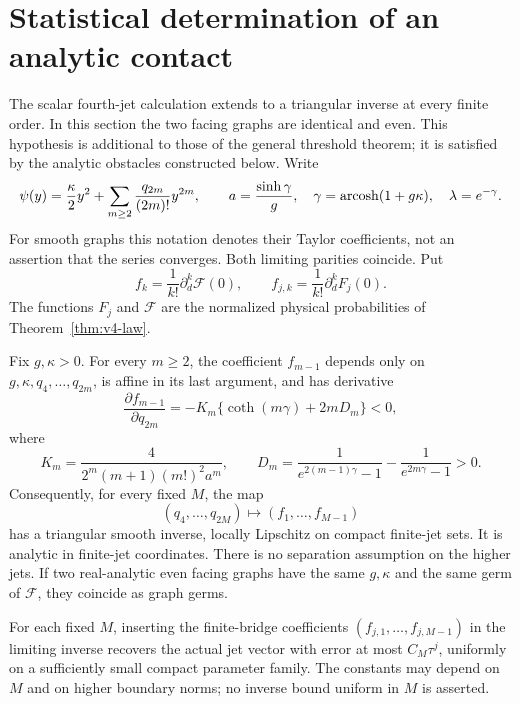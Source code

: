 \section{Statistical determination of an analytic contact}
\label{sec:v5-jets}
The scalar fourth-jet calculation extends to a triangular inverse at every
finite order. In this section the two facing graphs are identical and even.
This hypothesis is additional to those of the general threshold theorem;
it is satisfied by the analytic obstacles constructed below. Write
\begin{equation}\label{eq:v5-graph-series}
 \psi(y)=\frac\kappa2y^2+\sum_{m\ge2}\frac{q_{2m}}{(2m)!}y^{2m},
 \qquad a=\frac{\sinh\gamma}{g},\quad
 \gamma=\operatorname{arcosh}(1+g\kappa),\quad \lambda=e^{-\gamma}.
\end{equation}
For smooth graphs this notation denotes their Taylor coefficients, not an
assertion that the series converges. Both limiting parities coincide. Put
\[
 f_k=\frac1{k!}\partial_d^k\mathcal F(0),\qquad
 f_{j,k}=\frac1{k!}\partial_d^kF_j(0).
\]
The functions $F_j$ and $\mathcal F$ are the normalized physical
probabilities of Theorem~\ref{thm:v4-law}.

\begin{theorem}\label{thm:v5-jets}
Fix $g,\kappa>0$. For every $m\ge2$, the coefficient $f_{m-1}$ depends
only on $g,\kappa,q_4,\ldots,q_{2m}$, is affine in its last argument,
and has derivative
\begin{equation}\label{eq:v5-diagonal}
 \frac{\partial f_{m-1}}{\partial q_{2m}}
 =-K_m\{\coth(m\gamma)+2mD_m\}<0,
\end{equation}
where
\begin{equation}\label{eq:v5-constants}
 K_m=\frac{4}{2^m(m+1)(m!)^2a^m},\qquad
 D_m=\frac1{e^{2(m-1)\gamma}-1}
             -\frac1{e^{2m\gamma}-1}>0.
\end{equation}
Consequently, for every fixed $M$, the map
\[
 (q_4,\ldots,q_{2M})\longmapsto(f_1,\ldots,f_{M-1})
\]
has a triangular smooth inverse, locally Lipschitz on compact finite-jet
sets. It is analytic in finite-jet coordinates. There is no separation
assumption on the higher jets. If two real-analytic even facing graphs
have the same $g,\kappa$ and the same germ of $\mathcal F$, they coincide
as graph germs.

For each fixed $M$, inserting the finite-bridge coefficients
$(f_{j,1},\ldots,f_{j,M-1})$ in the limiting inverse recovers the actual
jet vector with error at most $C_M\tau^j$, uniformly on a sufficiently
small compact parameter family. The constants may depend on $M$ and on
higher boundary norms; no inverse bound uniform in $M$ is asserted.
\end{theorem}

